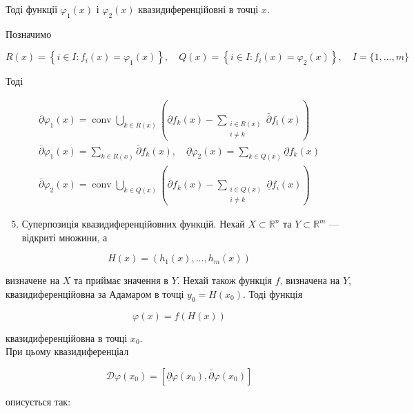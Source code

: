 \documentclass[12pt,a4paper]{extarticle}
\numberwithin{section}{part}
\begin{document}
Тоді функції $\varphi_{1}(x)$ і $\varphi_{2}(x)$ квазидиференційовні в точці $x$.

Позначимо

$$
R(x)=\left\{i \in I: f_{i}(x)=\varphi_{1}(x)\right\}, \quad Q(x)=\left\{i \in I: f_{i}(x)=\varphi_{2}(x)\right\}, \quad I=\{1, \ldots, m\}
$$

Тоді

$$
\begin{gathered}
\underline{\partial} \varphi_{1}(x)=\operatorname{conv} \bigcup_{k \in R(x)}\left(\underline{\partial} f_{k}(x)-\sum_{\substack{i \in R(x) \\
i \neq k}} \bar{\partial} f_{i}(x)\right) \\
\bar{\partial} \varphi_{1}(x)=\sum_{k \in R(x)} \bar{\partial} f_{k}(x), \quad \underline{\partial} \varphi_{2}(x)=\sum_{k \in Q(x)} \underline{\partial} f_{k}(x) \\
\bar{\partial} \varphi_{2}(x)=\operatorname{conv} \bigcup_{k \in Q(x)}\left(\bar{\partial} f_{k}(x)-\sum_{\substack{i \in Q(x) \\
i \neq k}} \underline{\partial} f_{i}(x)\right)
\end{gathered}
$$

\begin{enumerate}
  \setcounter{enumi}{4}
  \item Суперпозиція квазидиференційовних функцій. Нехай $X \subset \mathbb{R}^{n}$ та $Y \subset \mathbb{R}^{m}$ --- відкриті множини, а
\end{enumerate}

$$
H(x)=\left(h_{1}(x), \ldots, h_{m}(x)\right)
$$

визначене на $X$ та приймає значення в $Y$. Нехай також функція $f$, визначена на $Y$, квазидиференційовна за Адамаром в точці $y_{0}=H\left(x_{0}\right)$. Тоді функція

$$
\varphi(x)=f(H(x))
$$

квазидиференційовна в точці $x_{0}$.\\
При цьому квазидиференціал

$$
\mathcal{D} \varphi\left(x_{0}\right)=\left[\underline{\partial} \varphi\left(x_{0}\right), \bar{\partial} \varphi\left(x_{0}\right)\right]
$$

описується так:
\end{document}
